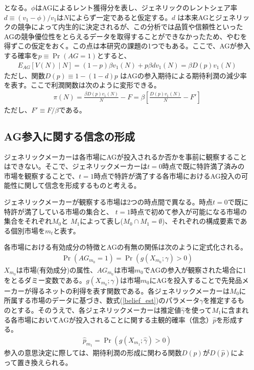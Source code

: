 \documentclass[a4j,10.5pt]{jarticle}
\begin{document}
となる。$\phi$はAGによるレント獲得分を表し、ジェネリックのレントシェア率$d \equiv (v_1 - \phi)/v_1$は$N$によらず一定であると仮定する。$d$ は本来AGとジェネリックの競争によって内生的に決定されるが、この分析では品質や信頼性といったAGの競争優位性をとらえるデータを取得することができなかったため、やむを得ずこの仮定をおく。この点は本研究の課題の1つでもある。ここで、AGが参入する確率を$p \equiv \Pr(AG = 1)$とすると、
\begin{align}
    E_{AG}[V(N) \mid N] = (1-p)\beta v_1(N) + p \beta d v_1(N) = \beta D(p) v_1(N)
\end{align}
ただし、関数$D(p) \equiv 1 - (1-d)p$ はAGの参入期待による期待利潤の減少率を表す。ここで利潤関数は次のように変形できる。
\begin{align}
    \label{pi}
    \pi(N) = \frac{\beta D(p) v_1(N)}{N} - F = \beta \left[ \frac{D(p)v_1(N)}{N} - F' \right]
\end{align}
ただし、$F' \equiv F / \beta$である。

\subsection{AG参入に関する信念の形成}
ジェネリックメーカーは各市場にAGが投入されるか否かを事前に観察することはできない。そこで、ジェネリックメーカーは$t =0$時点で既に特許満了済みの市場を観察することで、$t =1$時点で特許が満了する各市場におけるAG投入の可能性に関して信念を形成するものと考える。\par
ジェネリックメーカーが観察する市場は2つの時点間で異なる。時点$t=0$で既に特許が満了している市場の集合と、 $t=1$時点で初めて参入が可能になる市場の集合をそれぞれ$M_0$と $M_1$によって表し($M_0 \cap M_1=\emptyset$)、それぞれの構成要素である個別市場を$m_t$と表す。\par
各市場における有効成分の特徴とAGの有無の関係は次のように定式化される。
\begin{align}
    \label{belief_est}
    \Pr(AG_{m_0} = 1) = \Pr \left( g(X_{m_0}; \gamma) > 0 \right) 
\end{align}
$X_{m_0}$は市場(有効成分)の属性、$AG_{m_0}$は市場$m_0$でAGの参入が観察された場合に1をとるダミー変数である。$g(X_{m_0};\gamma )$は市場$m_0$にAGを投入することで先発品メーカーが得るネットの利得を表す関数である。各ジェネリックメーカーは$M_0$に所属する市場のデータに基づき、数式(\ref{belief_est})のパラメータ$\gamma$を推定するものとする。そのうえで、各ジェネリックメーカーは推定値$\hat{\gamma}$を使って$M_1$に含まれる各市場においてAGが投入されることに関する主観的確率（信念）$\hat{p}$を形成する。
\begin{align}
    \hat{p}_{m_1} = \Pr \left( g(X_{m_1}; \hat{\gamma}) > 0 \right)
\end{align}
参入の意思決定に際しては、期待利潤の形成に関わる関数$D(p)$が$D(\hat{p})$によって置き換えられる。
\end{document}
